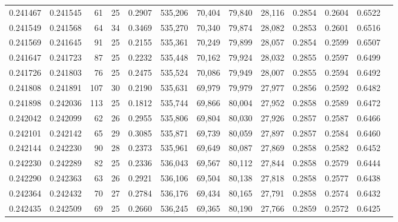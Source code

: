 \begin{tabular}{rrrrrrrrrrrrr}
0.241467 & 0.241545 &  61 &  25 &                                     0.2907 & 535,206 &  70,404 &  79,840 &  28,116 & 0.2854 & 0.2604 & 0.6522 \\
0.241549 & 0.241568 &  64 &  34 &                                     0.3469 & 535,270 &  70,340 &  79,874 &  28,082 & 0.2853 & 0.2601 & 0.6516 \\
0.241569 & 0.241645 &  91 &  25 &                                     0.2155 & 535,361 &  70,249 &  79,899 &  28,057 & 0.2854 & 0.2599 & 0.6507 \\
0.241647 & 0.241723 &  87 &  25 &                                     0.2232 & 535,448 &  70,162 &  79,924 &  28,032 & 0.2855 & 0.2597 & 0.6499 \\
0.241726 & 0.241803 &  76 &  25 &                                     0.2475 & 535,524 &  70,086 &  79,949 &  28,007 & 0.2855 & 0.2594 & 0.6492 \\
0.241808 & 0.241891 & 107 &  30 &                                     0.2190 & 535,631 &  69,979 &  79,979 &  27,977 & 0.2856 & 0.2592 & 0.6482 \\
0.241898 & 0.242036 & 113 &  25 &                                     0.1812 & 535,744 &  69,866 &  80,004 &  27,952 & 0.2858 & 0.2589 & 0.6472 \\
0.242042 & 0.242099 &  62 &  26 &                                     0.2955 & 535,806 &  69,804 &  80,030 &  27,926 & 0.2857 & 0.2587 & 0.6466 \\
0.242101 & 0.242142 &  65 &  29 &                                     0.3085 & 535,871 &  69,739 &  80,059 &  27,897 & 0.2857 & 0.2584 & 0.6460 \\
0.242144 & 0.242230 &  90 &  28 &                                     0.2373 & 535,961 &  69,649 &  80,087 &  27,869 & 0.2858 & 0.2582 & 0.6452 \\
0.242230 & 0.242289 &  82 &  25 &                                     0.2336 & 536,043 &  69,567 &  80,112 &  27,844 & 0.2858 & 0.2579 & 0.6444 \\
0.242290 & 0.242363 &  63 &  26 &                                     0.2921 & 536,106 &  69,504 &  80,138 &  27,818 & 0.2858 & 0.2577 & 0.6438 \\
0.242364 & 0.242432 &  70 &  27 &                                     0.2784 & 536,176 &  69,434 &  80,165 &  27,791 & 0.2858 & 0.2574 & 0.6432 \\
0.242435 & 0.242509 &  69 &  25 &                                     0.2660 & 536,245 &  69,365 &  80,190 &  27,766 & 0.2859 & 0.2572 & 0.6425 \\

\end{tabular}
